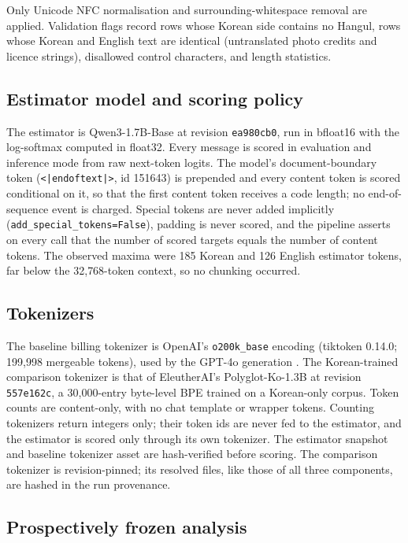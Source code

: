 \documentclass[11pt,a4paper]{article}
\begin{document}
Only Unicode NFC normalisation and surrounding-whitespace removal are
applied. Validation flags record rows whose Korean side contains no Hangul,
rows whose Korean and English text are identical (untranslated photo credits
and licence strings), disallowed control characters, and length statistics.

\subsection{Estimator model and scoring policy}

The estimator is Qwen3-1.7B-Base \citep{qwen3,qwen3model} at revision
\texttt{ea980cb0}, run in bfloat16 with the log-softmax computed in
float32. Every message is scored in evaluation and inference mode from raw
next-token logits. The model's document-boundary token
(\texttt{<|endoftext|>}, id 151643) is prepended and every content token is
scored conditional on it, so that the first content token receives a code
length; no end-of-sequence event is charged. Special tokens are never added
implicitly (\texttt{add\_special\_tokens=False}), padding is never scored,
and the pipeline asserts on every call that the number of scored targets
equals the number of content tokens. The observed maxima were 185 Korean and
126 English estimator tokens, far below the 32{,}768-token context, so no
chunking occurred.

\subsection{Tokenizers}

The baseline billing tokenizer is OpenAI's \texttt{o200k\_base} encoding
(tiktoken 0.14.0; 199{,}998 mergeable tokens), used by the GPT-4o
generation \citep{tiktoken}. The Korean-trained comparison tokenizer is that
of EleutherAI's Polyglot-Ko-1.3B \citep{polyglotko,polyglotkoartifact} at revision
\texttt{557e162c}, a 30{,}000-entry byte-level BPE trained on a Korean-only
corpus. Token counts are content-only, with no chat template or wrapper
tokens. Counting tokenizers return integers only; their token ids are never
fed to the estimator, and the estimator is scored only through its own
tokenizer. The estimator snapshot and baseline tokenizer asset are
hash-verified before scoring. The comparison tokenizer is revision-pinned;
its resolved files, like those of all three components, are hashed in the run
provenance.

\subsection{Prospectively frozen analysis}
\label{sec:prereg}
\end{document}

